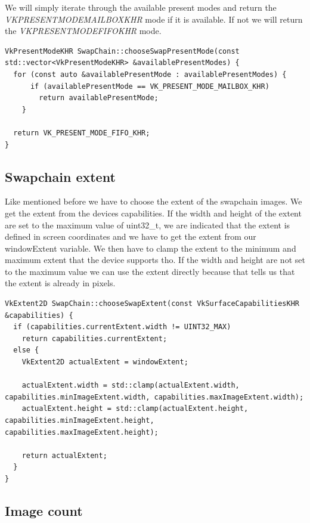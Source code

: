 \documentclass[12pt]{report} \usepackage{preamble}
\begin{document}
We will simply iterate through the available present modes and return the \\
\textit{VK\textunderscore PRESENT\textunderscore MODE\textunderscore MAILBOX\textunderscore KHR} mode
if it is available. If not we will return the \textit{VK\textunderscore PRESENT\textunderscore MODE\textunderscore FIFO\textunderscore KHR} mode.

\begin{lstlisting}[Language=C++]
VkPresentModeKHR SwapChain::chooseSwapPresentMode(const std::vector<VkPresentModeKHR> &availablePresentModes) {
  for (const auto &availablePresentMode : availablePresentModes) {
      if (availablePresentMode == VK_PRESENT_MODE_MAILBOX_KHR)
        return availablePresentMode;
    }

  return VK_PRESENT_MODE_FIFO_KHR;
}
\end{lstlisting}

\subsection{Swapchain extent}

Like mentioned before we have to choose the extent of the swapchain images. We get the extent
from the devices capabilities. If the width and height of the extent are set to the maximum
value of uint32\_t, we are indicated that the extent is defined in screen coordinates and we
have to get the extent from our windowExtent variable. We then have to clamp
the extent to the minimum and maximum extent that the device supports tho. If the width and height
are not set to the maximum value we can use the extent directly because that tells us that the extent
is already in pixels.

\begin{lstlisting}[Language=C++]
VkExtent2D SwapChain::chooseSwapExtent(const VkSurfaceCapabilitiesKHR &capabilities) {
  if (capabilities.currentExtent.width != UINT32_MAX)
    return capabilities.currentExtent;
  else {
    VkExtent2D actualExtent = windowExtent;

    actualExtent.width = std::clamp(actualExtent.width, capabilities.minImageExtent.width, capabilities.maxImageExtent.width);
    actualExtent.height = std::clamp(actualExtent.height, capabilities.minImageExtent.height, capabilities.maxImageExtent.height);

    return actualExtent;
  }
}
\end{lstlisting}

\subsection{Image count}
\end{document}
